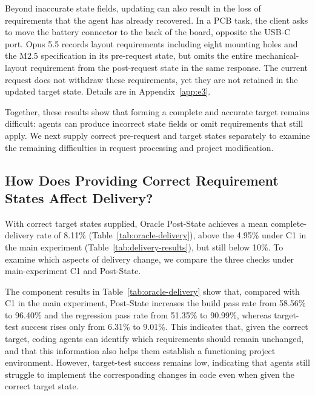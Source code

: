 \documentclass{article} %
\begin{document}
Beyond inaccurate state fields, updating can also result in the loss of requirements that the agent has already recovered. In a PCB task, the client asks to move the battery connector to the back of the board, opposite the USB-C port. Opus 5.5 records layout requirements including eight mounting holes and the M2.5 specification in its pre-request state, but omits the entire mechanical-layout requirement from the post-request state in the same response. The current request does not withdraw these requirements, yet they are not retained in the updated target state. Details are in Appendix~\ref{app:e3}.

Together, these results show that forming a complete and accurate target remains difficult: agents can produce incorrect state fields or omit requirements that still apply. We next supply correct pre-request and target states separately to examine the remaining difficulties in request processing and project modification.

\subsection{How Does Providing Correct Requirement States Affect Delivery?}
\label{sec:results-oracle}

With correct target states supplied, Oracle Post-State achieves a mean complete-delivery rate of 8.11\% (Table~\ref{tab:oracle-delivery}), above the 4.95\% under C1 in the main experiment (Table~\ref{tab:delivery-results}), but still below 10\%. To examine which aspects of delivery change, we compare the three checks under main-experiment C1 and Post-State.

The component results in Table~\ref{tab:oracle-delivery} show that, compared with C1 in the main experiment, Post-State increases the build pass rate from 58.56\% to 96.40\% and the regression pass rate from 51.35\% to 90.99\%, whereas target-test success rises only from 6.31\% to 9.01\%. This indicates that, given the correct target, coding agents can identify which requirements should remain unchanged, and that this information also helps them establish a functioning project environment. However, target-test success remains low, indicating that agents still struggle to implement the corresponding changes in code even when given the correct target state.
\end{document}
